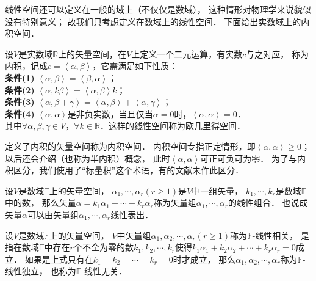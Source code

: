 线性空间还可以定义在一般的域上（不仅仅是数域），
这种情形对物理学来说貌似没有特别意义；
故我们只考虑定义在数域上的线性空间．
下面给出实数域上的内积空间．

\begin{definition} \label{chmla:def_Euclidean-space}
    设$V$是实数域$\mathbb{R}$上的矢量空间，在$V$上定义一个二元运算，有实数$c$与之对应，
    称为{\heiti 内积}，记成$c=\left<\alpha,\beta\right>$，它需满足如下性质：\\
    {\heiti\bfseries 条件(1)} \quad $\left<\alpha,\beta\right>=\left<\beta,\alpha\right>$；\\
    {\heiti\bfseries 条件(2)} \quad $\left<\alpha,k\beta\right>=\left<\alpha,\beta\right>k$；\\
    {\heiti\bfseries 条件(3)} \quad $\left<\alpha,\beta+\gamma\right>=\left<\alpha,\beta\right>+\left<\alpha,\gamma\right>$； \\
    {\heiti\bfseries 条件(4)} \quad $\left<\alpha,\alpha\right>$是非负实数，当且仅当$\alpha=0$时，$\left<\alpha,\alpha\right> = 0$．\\
    其中$\forall\alpha,\beta,\gamma \in V$，$\forall k\in \mathbb{R}$．这样的线性空间称为{\heiti 欧几里得空间}．
\end{definition}

定义了内积的矢量空间称为{\heiti 内积空间}．
内积空间专指正定情形，即$\left<\alpha,\alpha\right>\geqslant 0$；
以后还会介绍（也称为半内积）概念，
此时$\left<\alpha,\alpha\right>$可正可负可为零．
为了与内积区分，我们使用了“标量积”这个术语，有的文献未作此区分．





设$V$是数域$\mathbb{F}$上的矢量空间，
$\alpha_1,\cdots,\alpha_r(r\geqslant1)$是$V$中一组矢量，
$k_1,\cdots,k_r$是数域$\mathbb{F}$中的数，
那么矢量$\alpha = k_1\alpha_1+\cdots+k_r\alpha_r$称为矢量组$\alpha_1,\cdots,\alpha_r$的线性组合．
也说成矢量$\alpha$可以由矢量组$\alpha_1,\cdots,\alpha_r$线性表出．

\begin{definition}\label{chmla:def_linear-dependence_base}
    设$V$是数域$\mathbb{F}$上的矢量空间，
    $V$中矢量组$\alpha_1,\alpha_2,\cdots,\alpha_r(r\geqslant1)$称为$\mathbb{F}$-{\heiti 线性相关}，
    是指在数域$\mathbb{F}$中存在$r$个不全为零的数$k_1,k_2,\cdots,k_r$使得$k_1\alpha_1+k_2\alpha_2+\cdots+k_r\alpha_r=0$成立．
    如果是上式只有在$k_1=k_2=\cdots=k_r=0$时才成立，
    那么$\alpha_1,\alpha_2,\cdots,\alpha_r$称为$\mathbb{F}$-{\heiti 线性独立}，
    也称为$\mathbb{F}$-{\heiti 线性无关}．
\end{definition}


